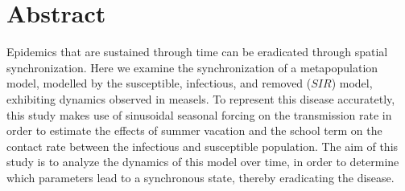 \documentclass[twocolumn,nofootinbib,showkeys,twoside,floatfix,unsortedaddress,flushbottom,10pt,aps,pra]{report}
\begin{document}
% 

\twocolumn

\section{Abstract} 
Epidemics that are sustained through time can be eradicated through spatial synchronization. Here we examine the synchronization of a metapopulation model, modelled by the susceptible, infectious, and removed ($SIR$) model, exhibiting dynamics observed in measels. To represent this disease accuratetly, this study makes use of sinusoidal seasonal forcing \cite{olsen1990chaos} on the transmission rate in order to estimate the effects of summer vacation and the school term on the contact rate between the infectious and susceptible population. The aim of this study is to analyze the dynamics of this model over time, in order to determine which parameters lead to a synchronous state, thereby eradicating the disease.
\par \smallskip \qquad
\end{document}
